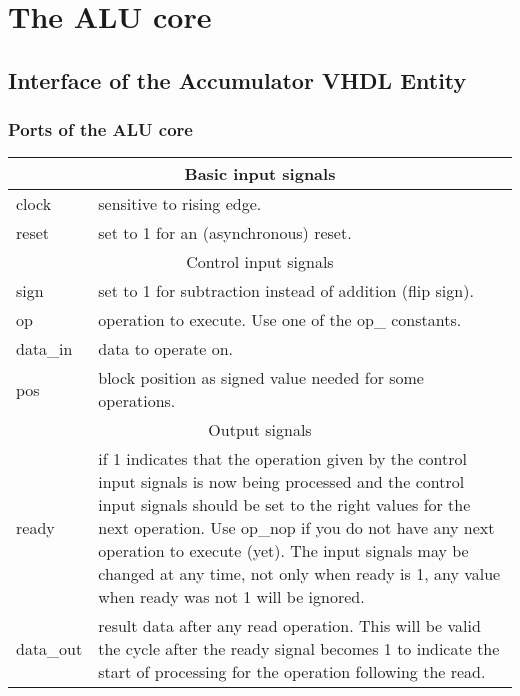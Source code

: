 \chapter{The ALU core}
\section{Interface of the Accumulator VHDL Entity}
\subsection{Ports of the ALU core}
\newcommand\tabhead[1]{\hline\multicolumn{2}{|c|}{#1}\\ \hline}
\newcommand\tabline[2]{#1 & #2\\ \hline}
\begin{center}
\begin{tabular}{|l|p{}|}
\tabhead     {Basic input signals}
\tabline {clock}     {sensitive to rising edge.}
\tabline {reset}     {set to 1 for an (asynchronous) reset.}
\hline
\tabhead     {Control input signals}
\tabline {sign}      {set to 1 for subtraction instead of addition (flip sign).}
\tabline {op}        {operation to execute. Use one of the op\_ constants.}
\tabline {data\_in}  {data to operate on.}
\tabline {pos}       {block position as signed value needed for some operations.}
\hline
\tabhead     {Output signals}
\tabline {ready}     {
        if 1 indicates that the operation given by the control input signals
        is now being processed and the control input signals should be set to
        the right values for the next operation.
        Use op\_nop if you do not have any next operation to execute (yet).
        The input signals may be changed at any time, not only when ready
        is 1, any value when ready was not 1 will be ignored.}
\tabline {data\_out} {
        result data after any read operation. This will be valid the
        cycle after the ready signal becomes 1 to indicate the start of
        processing for the operation following the read.}
\end{tabular}
\end{center}

